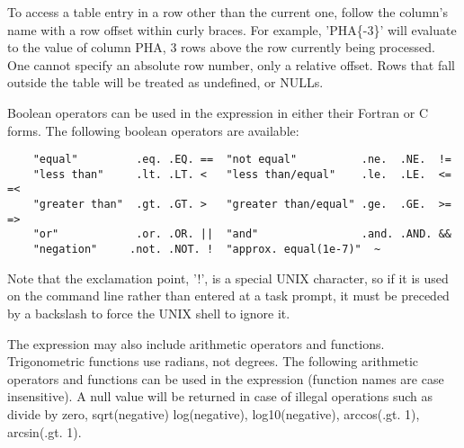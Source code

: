 \documentclass[11pt]{book}
\begin{document}
    To access a table entry in a row other  than the current one, follow
    the  column's name  with  a row  offset  within  curly  braces.  For
    example, 'PHA\{-3\}' will evaluate to the value  of column PHA, 3 rows
    above  the  row currently  being processed.   One  cannot specify an
    absolute row number, only a relative offset.  Rows that fall outside
    the table will be treated as undefined, or NULLs.

    Boolean   operators can be  used in  the expression  in either their
    Fortran or C forms.  The following boolean operators are available:

\begin{verbatim}
    "equal"         .eq. .EQ. ==  "not equal"          .ne.  .NE.  !=
    "less than"     .lt. .LT. <   "less than/equal"    .le.  .LE.  <= =<
    "greater than"  .gt. .GT. >   "greater than/equal" .ge.  .GE.  >= =>
    "or"            .or. .OR. ||  "and"                .and. .AND. &&
    "negation"     .not. .NOT. !  "approx. equal(1e-7)"  ~
\end{verbatim}

Note  that the exclamation
point,  '!', is a special UNIX character, so if it is used  on the
command line rather than entered at a task prompt, it must be  preceded
by a backslash to force the UNIX shell to ignore it.

    The expression may  also include arithmetic operators and functions.
    Trigonometric  functions use  radians,  not degrees.  The  following
    arithmetic  operators and  functions  can be  used in the expression
    (function names are case insensitive). A null value will be returned
    in case of illegal operations such as divide by zero, sqrt(negative)
    log(negative), log10(negative), arccos(.gt. 1), arcsin(.gt. 1).
\end{document}
